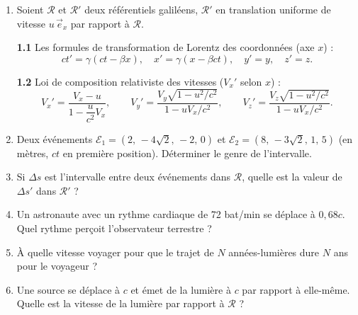 \documentclass[12pt,a4paper]{article}
\begin{document}
\begin{boiteexercice}
\begin{enumerate}
  \item Soient $\mathcal{R}$ et $\mathcal{R}'$ deux référentiels galiléens, $\mathcal{R}'$ en translation uniforme de vitesse $u\,\vec{e}_x$ par rapport à $\mathcal{R}$.

  \textbf{1.1} Les formules de transformation de Lorentz des coordonnées (axe $x$) :
  \[
  \boxed{ct'=\gamma(ct-\beta x),\quad x'=\gamma(x-\beta ct),\quad y'=y,\quad z'=z.}
  \]

  \textbf{1.2} Loi de composition relativiste des vitesses ($V_x'$ selon $x$) :
  \[
  V_x' = \frac{V_x - u}{1-\dfrac{u}{c^2}V_x}, \qquad
  V_y' = \frac{V_y\sqrt{1-u^2/c^2}}{1-uV_x/c^2}, \qquad
  V_z' = \frac{V_z\sqrt{1-u^2/c^2}}{1-uV_x/c^2}.
  \]

  \item Deux événements $\mathcal{E}_1 = (2,\,-4\sqrt{2},\,-2,\,0)$ et $\mathcal{E}_2 = (8,\,-3\sqrt{2},\,1,\,5)$ (en mètres, $ct$ en première position). Déterminer le genre de l'intervalle.

  \item Si $\Delta s$ est l'intervalle entre deux événements dans $\mathcal{R}$, quelle est la valeur de $\Delta s'$ dans $\mathcal{R}'$ ?

  \item Un astronaute avec un rythme cardiaque de 72 bat/min se déplace à $0{,}68c$. Quel rythme perçoit l'observateur terrestre ?

  \item À quelle vitesse voyager pour que le trajet de $N$ années-lumières dure $N$ ans pour le voyageur ?

  \item Une source se déplace à $c$ et émet de la lumière à $c$ par rapport à elle-même. Quelle est la vitesse de la lumière par rapport à $\mathcal{R}$ ?
\end{enumerate}
\end{boiteexercice}
\end{document}
